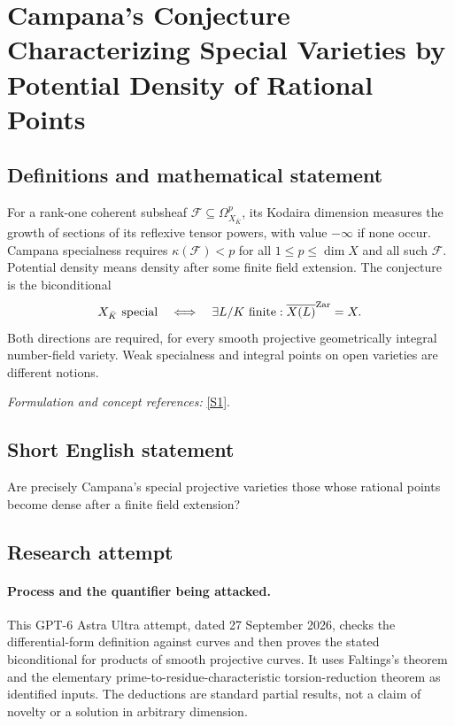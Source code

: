 \documentclass[11pt]{article}
\begin{document}
\section*{\texorpdfstring{Campana's Conjecture Characterizing Special Varieties by Potential Density of Rational Points}{Campana's Conjecture Characterizing Special Varieties by Potential Density of Rational Points}}\label{86}
\subsection{Definitions and mathematical statement}
For a rank-one coherent subsheaf $\mathcal F\subseteq\Omega^p_{X_{\bar K}}$, its Kodaira dimension measures the growth of sections of its reflexive tensor powers, with value $-\infty$ if none occur. Campana specialness requires $\kappa(\mathcal F)<p$ for all $1\le p\le\dim X$ and all such $\mathcal F$. Potential density means density after some finite field extension. The conjecture is the biconditional
\[
 X_{\bar K}\text{ special}\quad\Longleftrightarrow\quad
 \exists L/K\text{ finite}:\overline{X(L)}^{\rm Zar}=X.
\]
Both directions are required, for every smooth projective geometrically integral number-field variety. Weak specialness and integral points on open varieties are different notions.
\par\smallskip\textit{Formulation and concept references:} \href{https://arxiv.org/pdf/math/0701105}{[S1]}.

\subsection{Short English statement}
Are precisely Campana's special projective varieties those whose rational points become dense after a finite field extension?
\subsection{Research attempt}
\paragraph{Process and the quantifier being attacked.}
This GPT-6 Astra Ultra attempt, dated 27 September 2026, checks the differential-form definition against curves and then proves the stated biconditional for products of smooth projective curves. It uses Faltings's theorem and the elementary prime-to-residue-characteristic torsion-reduction theorem as identified inputs. The deductions are standard partial results, not a claim of novelty or a solution in arbitrary dimension.
\end{document}
